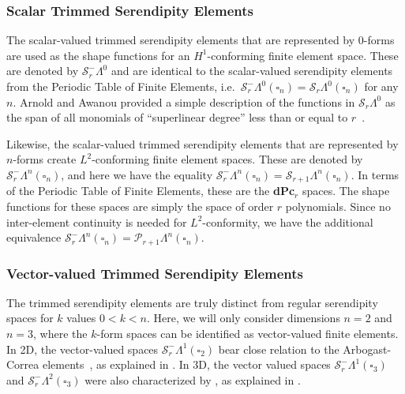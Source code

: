 \documentclass[format=acmsmall,screen,timestamp=false,a4paper]{acmart}
\newcommand{\calP}{\mathcal{P}}
\newcommand{\calS}{\mathcal{S}}
\begin{document}
	
	
  
  
  \subsubsection{Scalar Trimmed Serendipity Elements}
  The scalar-valued trimmed serendipity elements that are represented by $0$-forms are used as the shape functions for an $H^1$-conforming finite element space.  These are denoted by $\calS_r^-\Lambda^0$ and are identical to the scalar-valued serendipity elements from the Periodic Table of Finite Elements, i.e.\ $\calS_r^-\Lambda^0(\square_n) = \calS_r\Lambda^0(\square_n)$ for any $n$.  Arnold and Awanou provided a simple description of the functions in $\mathcal{S}_r\Lambda^0$ as the span of all monomials of ``superlinear degree'' less than or equal to $r$~\cite{arnold2011serendipity}. 
  
  Likewise, the scalar-valued trimmed serendipity elements that are represented by $n$-forms create $L^2$-conforming finite element spaces.  These are denoted by $\calS_r^-\Lambda^n(\square_n)$, and here we have the equality $\calS_r^-\Lambda^n(\square_n) = \calS_{r+1}\Lambda^n(\square_n)$.  In terms of the Periodic Table of Finite Elements, these are the \textbf{dPc}$_r$ spaces.  The shape functions for these spaces are simply the space of order $r$ polynomials.  Since no inter-element continuity is needed for $L^2$-conformity, we have the additional equivalence $\calS_r^-\Lambda^n(\square_n) = \calP_{r+1}\Lambda^n(\square_n)$.
  
  \subsubsection{Vector-valued Trimmed Serendipity Elements}
  

	The trimmed serendipity elements are truly distinct from regular serendipity spaces for $k$ values $0<k<n$.  Here, we will only consider dimensions $n=2$ and $n=3$, where the $k$-form spaces can be identified as vector-valued finite elements.  	
	In 2D, the vector-valued spaces $\calS_r^-\Lambda^1(\square_2)$ bear close relation to the Arbogast-Correa elements~\citep{arbogast2016two}, as explained in \citet[Prop 2.2]{gillette2019trimmed}.
	In 3D, the vector valued spaces $\calS_r^-\Lambda^1(\square_3)$ and $\calS_r^-\Lambda^2(\square_3)$ were also characterized by \citet{CF2016}, as explained in \citet[Prop 2.3]{gillette2019trimmed}.
\end{document}
